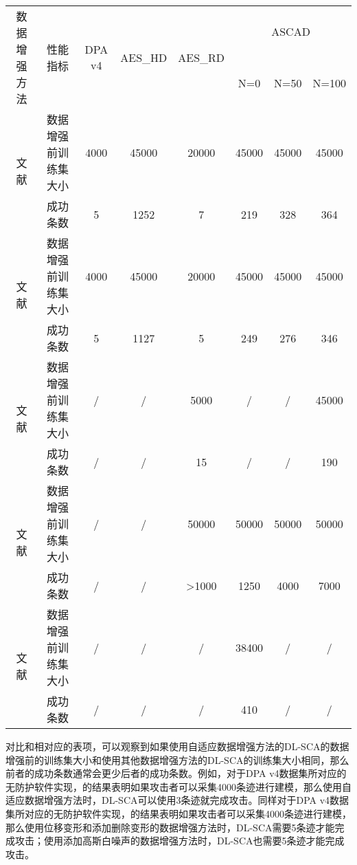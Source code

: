 {	\begin{table}[!h]
		\label{tab:othermtd}
		\centering
		\footnotesize
		\begin{tabular}{cc|cccccc}
			\hline
			\multirow{2}{*}{数据增强方法} &\multirow{2}{*}{性能指标} &\multirow{2}{*}{DPA v4}&\multirow{2}{*}{AES\_HD}&\multirow{2}{*}{AES\_RD}& \multicolumn{3}{c}{ASCAD} \\
			\multicolumn{2}{c|}{}&&&&N=0 & N=50 & N=100 \\
			\hline
			\hline    
			\multirow{2}{*}{文献\normalcite{Cagli17}}
				&数据增强前训练集大小       &4000&45000&20000&45000&45000&45000\\
				&成功条数     &5&1252&7&219&328&364        \\
			\hline
			\multirow{2}{*}{文献\normalcite{Kim19}}
				&数据增强前训练集大小       &4000&45000&20000&45000&45000&45000\\
				&成功条数    &5&1127&5&249&276&346\\
			\hline
			\multirow{2}{*}{文献\normalcite{Won20}}
				&数据增强前训练集大小       &/&/&5000&/&/&45000\\
				&成功条数    &/&/&15&/&/&190\\
			\hline
			\multirow{2}{*}{文献\normalcite{Luo21}}
				&数据增强前训练集大小       &/&/&50000&50000&50000&50000\\
				&成功条数    &/&/&>1000&1250&4000&7000\\
			\hline
			\multirow{2}{*}{文献\normalcite{Mukhtar22}}
				&数据增强前训练集大小       &/&/&/&38400&/&/\\
				&成功条数    &/&/&/&410&/&/\\
			\hline
			
		\end{tabular}   
	\end{table}

	对比和相对应的表项，可以观察到如果使用自适应数据增强方法的DL-SCA的数据增强前的训练集大小和使用其他数据增强方法的DL-SCA的训练集大小相同，那么前者的成功条数通常会更少后者的成功条数。例如，对于DPA v4数据集所对应的无防护软件实现，的结果表明如果攻击者可以采集4000条迹进行建模，那么使用自适应数据增强方法时，DL-SCA可以使用3条迹就完成攻击。同样对于DPA v4数据集所对应的无防护软件实现，的结果表明如果攻击者可以采集4000条迹进行建模，那么使用位移变形和添加删除变形的数据增强方法时，DL-SCA需要5条迹才能完成攻击；使用添加高斯白噪声的数据增强方法时，DL-SCA也需要5条迹才能完成攻击。

}
